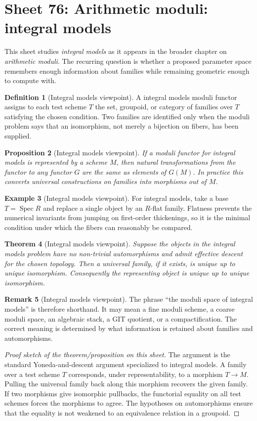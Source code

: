\documentclass[11pt]{amsart}
\newtheorem{theorem}{Theorem}[section]
\newtheorem{proposition}[theorem]{Proposition}
\theoremstyle{definition}
\newtheorem{definition}[theorem]{Definition}
\newtheorem{example}[theorem]{Example}
\newtheorem{remark}[theorem]{Remark}
\newcommand{\Spec}{\operatorname{Spec}}
\begin{document}
\section{Sheet 76: Arithmetic moduli: integral models}
This sheet studies \emph{integral models} as it appears in the broader chapter on \emph{arithmetic moduli}.  The recurring question is whether a proposed parameter space remembers enough information about families while remaining geometric enough to compute with.
\begin{definition}[Integral models viewpoint]
A integral models moduli functor assigns to each test scheme $T$ the set, groupoid, or category of families over $T$ satisfying the chosen condition.  Two families are identified only when the moduli problem says that an isomorphism, not merely a bijection on fibers, has been supplied.
\end{definition}
\begin{proposition}[Integral models viewpoint]
If a moduli functor for integral models is represented by a scheme $M$, then natural transformations from the functor to any functor $G$ are the same as elements of $G(M)$.  In practice this converts universal constructions on families into morphisms out of $M$.
\end{proposition}
\begin{example}[Integral models viewpoint]
For integral models, take a base $T=\Spec R$ and replace a single object by an $R$-flat family.  Flatness prevents the numerical invariants from jumping on first-order thickenings, so it is the minimal condition under which the fibers can reasonably be compared.
\end{example}
\begin{theorem}[Integral models viewpoint]
Suppose the objects in the integral models problem have no non-trivial automorphisms and admit effective descent for the chosen topology.  Then a universal family, if it exists, is unique up to unique isomorphism.  Consequently the representing object is unique up to unique isomorphism.
\end{theorem}
\begin{remark}[Integral models viewpoint]
The phrase ``the moduli space of integral models'' is therefore shorthand.  It may mean a fine moduli scheme, a coarse moduli space, an algebraic stack, a GIT quotient, or a compactification.  The correct meaning is determined by what information is retained about families and automorphisms.
\end{remark}
\begin{proof}[Proof sketch of the theorem/proposition on this sheet]
The argument is the standard Yoneda-and-descent argument specialized to integral models.  A family over a test scheme $T$ corresponds, under representability, to a morphism $T\to M$.  Pulling the universal family back along this morphism recovers the given family.  If two morphisms give isomorphic pullbacks, the functorial equality on all test schemes forces the morphisms to agree.  The hypotheses on automorphisms ensure that the equality is not weakened to an equivalence relation in a groupoid.
\end{proof}
\end{document}
